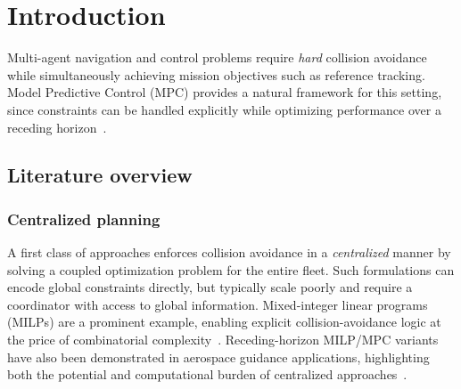 \documentclass[twocolumn]{autart}
\begin{document}
\theoremstyle{definition}
\newtheorem{assumption}{Assumption}
\newtheorem{remark}{Remark}
\newtheorem{definition}{Definition}
\newtheorem{corollary}{Corollary}
\newenvironment{proof}
  {\par\noindent\textbf{\textit{Proof: }}\itshape}
  {\hfill$\square$\par}
\section{Introduction}

Multi-agent navigation and control problems require \emph{hard} collision avoidance while simultaneously achieving mission objectives such as reference tracking.
Model Predictive Control (MPC) provides a natural framework for this setting, since constraints can be handled explicitly while optimizing performance over a receding horizon~\cite{Mayne2000}.
\subsection{Literature overview}
\subsubsection*{Centralized planning}
A first class of approaches enforces collision avoidance in a \emph{centralized} manner by solving a coupled optimization problem for the entire fleet. Such formulations can encode global constraints directly, but typically scale poorly and require a coordinator with access to global information. Mixed-integer linear programs (MILPs) are a prominent example, enabling explicit collision-avoidance logic at the price of combinatorial complexity~\cite{Schouwenaars2001ECC,RichardsSchouwenaarsHowFeron2002}. Receding-horizon MILP/MPC variants have also been demonstrated in aerospace guidance applications, highlighting both the potential and computational burden of centralized approaches~\cite{SchouwenaarsValentiFeronHow2005}.
\end{document}
